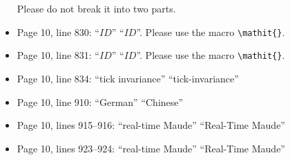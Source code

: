 \documentclass[12pt,onecolumn]{IEEEtranTIE}
\begin{document}
\begin{itemize}
Please do not break it into two parts.

\item Page 10, line 830: ``$ID$'' \by ``$\mathit{ID}$''. Please use
  the macro \verb|\mathit{}|.

\item Page 10, line 831: ``$ID$'' \by ``$\mathit{ID}$''. Please use
  the macro \verb|\mathit{}|.

\item Page 10, line 834: ``tick invariance'' \by ``tick-invariance''

\item Page 10, line 910: ``German'' \by ``Chinese''

\item Page 10, lines 915--916: ``real-time Maude'' \by ``Real-Time
  Maude''

\item Page 10, lines 923--924: ``real-time Maude'' \by ``Real-Time
  Maude''

\end{itemize}
\end{document}
